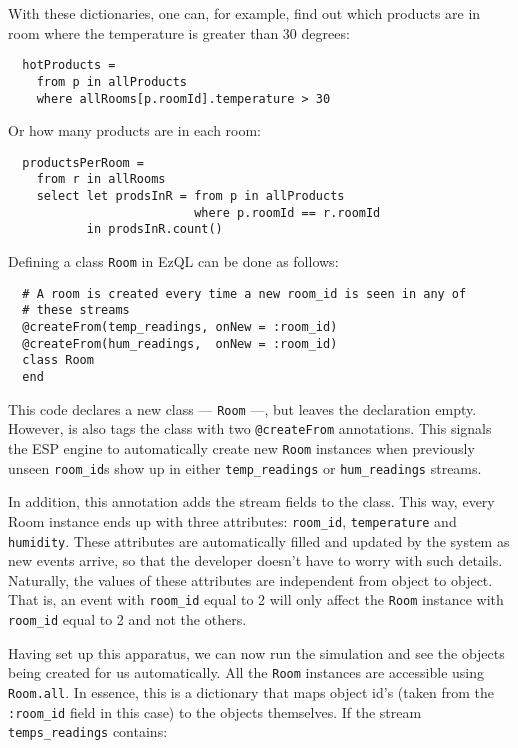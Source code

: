 \documentclass[a4,11pt]{report}
\begin{document}
With these dictionaries, one can, for example, find out which products
are in room where the temperature is greater than 30 degrees:

\begin{lstlisting}
  hotProducts =
    from p in allProducts
    where allRooms[p.roomId].temperature > 30
\end{lstlisting}

Or how many products are in each room:

\begin{lstlisting}
  productsPerRoom =
    from r in allRooms
    select let prodsInR = from p in allProducts
                          where p.roomId == r.roomId
           in prodsInR.count()
\end{lstlisting}




Defining a class \verb=Room= in EzQL can be done as follows:

\begin{lstlisting}
  # A room is created every time a new room_id is seen in any of
  # these streams
  @createFrom(temp_readings, onNew = :room_id)
  @createFrom(hum_readings,  onNew = :room_id)
  class Room
  end
\end{lstlisting}

This code declares a new class --- \verb=Room= ---, but leaves the
declaration empty. However, is also tags the class with two
\verb=@createFrom= annotations. This signals the ESP engine to
automatically create new \verb=Room= instances when previously unseen
\verb=room_id=s show up in either \verb=temp_readings= or
\verb=hum_readings= streams.

In addition, this annotation adds the stream fields to the class. This
way, every Room instance ends up with three attributes:
\verb=room_id=, \verb=temperature= and \verb=humidity=. These
attributes are automatically filled and updated by the system as new
events arrive, so that the developer doesn't have to worry with such
details. Naturally, the values of these attributes are independent
from object to object. That is, an event with \verb=room_id= equal to
2 will only affect the \verb=Room= instance with \verb=room_id= equal
to 2 and not the others.

Having set up this apparatus, we can now run the simulation and see
the objects being created for us automatically. All the \verb=Room=
instances are accessible using \verb=Room.all=. In essence, this is a
dictionary that maps object id's (taken from the \verb=:room_id= field
in this case) to the objects themselves. If the stream
\verb=temps_readings= contains:
\end{document}
